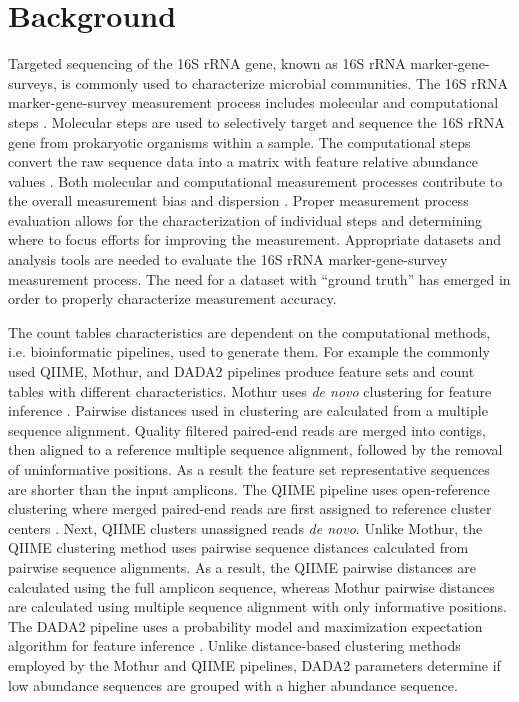 \documentclass{bmcart}
\begin{document}
\section*{Background}

Targeted sequencing of the 16S rRNA gene, known as 16S rRNA
marker-gene-surveys, is commonly used to characterize
microbial communities. The 16S rRNA marker-gene-survey
measurement process includes molecular and
computational steps \cite{Goodrich2014}.
Molecular steps are used to selectively target and sequence the 16S rRNA
gene from prokaryotic organisms within a sample. The computational steps
convert the raw sequence data into a matrix with feature relative abundance values
\cite{Goodrich2014}. Both molecular and computational measurement
processes contribute to the overall measurement bias and dispersion
\cite{Amore2016, Goodrich2014, brooks2015truth}. Proper measurement
process evaluation allows for the characterization of individual
steps and determining where to focus efforts for improving the measurement. Appropriate
datasets and analysis tools are needed to evaluate the 16S rRNA
marker-gene-survey measurement process. The need for a  dataset with
``ground truth'' has emerged in order to properly characterize measurement accuracy.

The count tables characteristics are dependent on the computational methods, i.e. bioinformatic pipelines, used to generate them.
For example the commonly used QIIME, Mothur, and
DADA2 pipelines produce feature sets and count tables with different characteristics. 
Mothur uses \emph{de novo} clustering for feature
inference \cite{westcott2017opticlust, schloss2009introducing}.
Pairwise distances used in clustering are calculated from a multiple
sequence alignment. Quality filtered paired-end reads are merged
into contigs, then aligned to a reference multiple
sequence alignment, followed by the removal of uninformative positions.
As a result the feature set representative sequences are shorter than the input amplicons. 
The QIIME pipeline uses open-reference clustering
where merged paired-end reads are first assigned to reference cluster
centers \cite{Rideout2014, Caporaso2010}. Next, QIIME clusters
unassigned reads \emph{de novo}. Unlike Mothur, the QIIME clustering
method uses pairwise sequence distances calculated from pairwise
sequence alignments. As a result, the QIIME pairwise distances are
calculated using the full amplicon sequence, whereas
Mothur pairwise distances are calculated using multiple
sequence alignment with only informative positions.
The DADA2 pipeline uses a probability model and
maximization expectation algorithm for feature inference
\cite{callahan2016dada2}. Unlike distance-based clustering methods
employed by the Mothur and QIIME pipelines, DADA2 parameters determine
if low abundance sequences are grouped with a higher abundance sequence.
\end{document}
